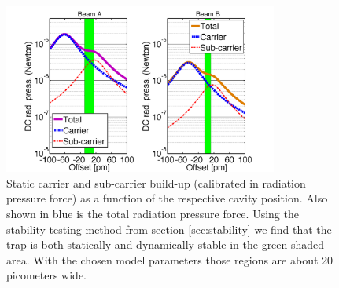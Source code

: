 \begin{figure}[htbp]
	\centering
		\includegraphics[width=9cm]{./figures/DC_offset_paper3.pdf}
	\caption{{Static carrier and sub-carrier build-up (calibrated in radiation pressure force) as a function of the respective cavity position. Also shown in blue is the total radiation pressure force. Using the stability testing method from section \ref{sec:stability} we find that the trap is both statically and dynamically stable in the green shaded area.
With the chosen model parameters those regions are about 
20 picometers wide.}}
	\label{fig:stability_region}
\end{figure}



